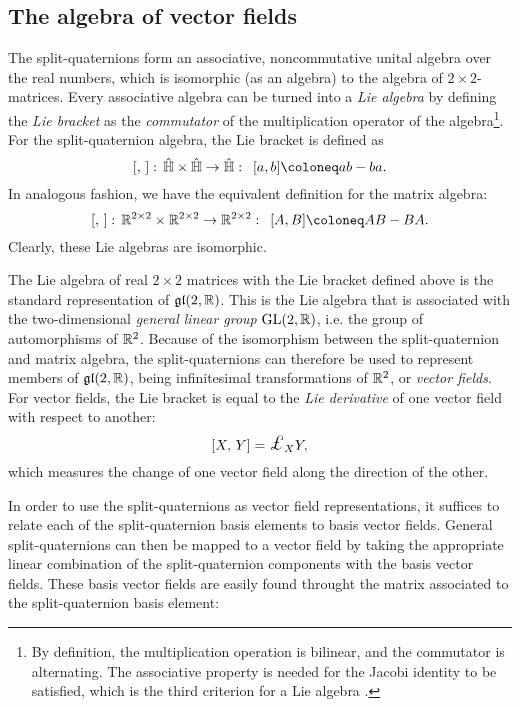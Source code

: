 \subsection{The algebra of vector fields}
\label{ssec:vf_algebra}
The split-quaternions form an associative, noncommutative unital algebra over the real numbers, which is isomorphic (as an algebra) to the algebra of $2\times 2$-matrices. Every associative algebra can be turned into a \emph{Lie algebra} by defining the \emph{Lie bracket} as the \emph{commutator} of the multiplication operator of the algebra\footnote{By definition, the multiplication operation is bilinear, and the commutator is alternating. The associative property is needed for the Jacobi identity to be satisfied, which is the third criterion for a Lie algebra \cite{bourbaki1975}.}. For the split-quaternion algebra, the Lie bracket is defined as
\begin{equation}
    \liebr{}{}:\, \spquaternions \times \spquaternions \to \spquaternions: \;\: [a, b] \coloneq ab - ba.
\end{equation}
In analogous fashion, we have the equivalent definition for the matrix algebra:
\begin{equation}
    \liebr{}{}:\, \real^{2\times 2} \times \real^{2\times 2} \to \real^{2\times 2}: \;\: [A, B] \coloneq AB - BA.
\end{equation}
Clearly, these Lie algebras are isomorphic. 

The Lie algebra of real $2\times2$ matrices with the Lie bracket defined above is the standard representation of $\mathfrak{gl}(2, \mathbb{R})$. This is the Lie algebra that is associated with the two-dimensional \emph{general linear group} $\mathrm{GL}(2, \mathbb{R})$, i.e. the group of automorphisms of $\mathbb{R}^2$. Because of the isomorphism between the split-quaternion and matrix algebra, the split-quaternions can therefore be used to represent members of $\mathfrak{gl}(2, \mathbb{R})$, being infinitesimal transformations of $\mathbb{R}^2$, or \emph{vector fields}. For vector fields, the Lie bracket is equal to the \emph{Lie derivative} of one vector field with respect to another:
\begin{equation}
    \liebr{X}{Y} = \lied{X}{Y},
\end{equation}
which measures the change of one vector field along the direction of the other. 

In order to use the split-quaternions as vector field representations, it suffices to relate each of the split-quaternion basis elements to basis vector fields. General split-quaternions can then be mapped to a vector field by taking the appropriate linear combination of the split-quaternion components with the basis vector fields. These basis vector fields are easily found throught the matrix associated to the split-quaternion basis element:

